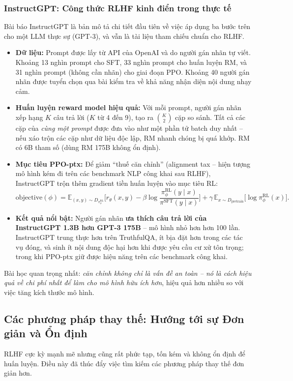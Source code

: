 \subsubsection{InstructGPT: Công thức RLHF kinh điển trong thực tế \newtag}
\label{sssec:instructgpt}
Bài báo InstructGPT \cite{ouyang2022training} là bản mô tả chi tiết đầu tiên về việc áp dụng ba bước trên cho một LLM thực sự (GPT-3), và vẫn là tài liệu tham chiếu chuẩn cho RLHF.
\begin{itemize}
	\item \textbf{Dữ liệu:} Prompt được lấy từ API của OpenAI và do người gán nhãn tự viết. Khoảng 13 nghìn prompt cho SFT, 33 nghìn prompt cho huấn luyện RM, và 31 nghìn prompt (không cần nhãn) cho giai đoạn PPO. Khoảng 40 người gán nhãn được tuyển chọn qua bài kiểm tra về khả năng nhận diện nội dung nhạy cảm.
	\item \textbf{Huấn luyện reward model hiệu quả:} Với mỗi prompt, người gán nhãn xếp hạng $K$ câu trả lời ($K$ từ 4 đến 9), tạo ra $\binom{K}{2}$ cặp so sánh. Tất cả các cặp của \emph{cùng một prompt} được đưa vào như một phần tử batch duy nhất -- nếu xáo trộn các cặp như dữ liệu độc lập, RM nhanh chóng bị quá khớp. RM có 6B tham số (dùng RM 175B không ổn định).
	\item \textbf{Mục tiêu PPO-ptx:} Để giảm “thuế căn chỉnh” (alignment tax -- hiện tượng mô hình kém đi trên các benchmark NLP công khai sau RLHF), InstructGPT trộn thêm gradient tiền huấn luyện vào mục tiêu RL:
	\[
	\text{objective}(\phi) = \mathbb{E}_{(x,y)\sim D_{\pi_\phi^{\text{RL}}}}\Big[r_\theta(x,y) - \beta \log\frac{\pi_\phi^{\text{RL}}(y\mid x)}{\pi^{\text{SFT}}(y\mid x)}\Big] + \gamma\, \mathbb{E}_{x\sim D_{\text{pretrain}}}\Big[\log \pi_\phi^{\text{RL}}(x)\Big].
	\]
	\item \textbf{Kết quả nổi bật:} Người gán nhãn \textbf{ưa thích câu trả lời của InstructGPT 1.3B hơn GPT-3 175B} -- mô hình nhỏ hơn hơn 100 lần. InstructGPT trung thực hơn trên TruthfulQA, ít bịa đặt hơn trong các tác vụ đóng, và sinh ít nội dung độc hại hơn khi được yêu cầu cư xử tôn trọng; trong khi PPO-ptx giữ được hiệu năng trên các benchmark công khai.
\end{itemize}
Bài học quan trọng nhất: \emph{căn chỉnh không chỉ là vấn đề an toàn -- nó là cách hiệu quả về chi phí nhất để làm cho mô hình hữu ích hơn}, hiệu quả hơn nhiều so với việc tăng kích thước mô hình.

\subsection{Các phương pháp thay thế: Hướng tới sự Đơn giản và Ổn định}
\label{ssec:rlhf_alternatives}
RLHF cực kỳ mạnh mẽ nhưng cũng rất phức tạp, tốn kém và không ổn định để huấn luyện. Điều này đã thúc đẩy việc tìm kiếm các phương pháp thay thế đơn giản hơn.

